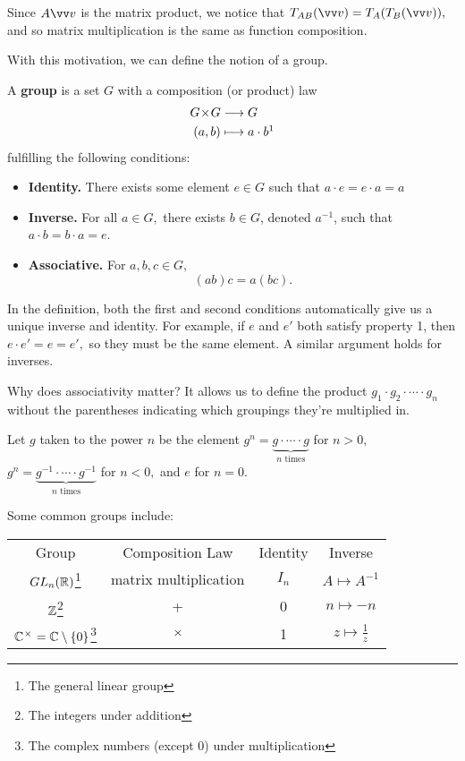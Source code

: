 Since $A\vvv$ is the matrix product, we notice that $T_{AB}(\vvv) = T_A(T_B(\vvv)),$ and so matrix multiplication is the same as function composition. 

With this motivation, we can define the notion of a group. 
\begin{definition}[Group]
A \textbf{group} is a set $G$ with a composition (or product) law 
\begin{align*}
    G \by G &\rto G \\
    (a, b) &\mto a\cdot b\footnotemark %
\end{align*}
fulfilling the following conditions:
\begin{itemize}
    \item \textbf{Identity.} There exists some element $e \in G$ such that $a \cdot e = e \cdot a = a$
    \item \textbf{Inverse.} For all $a \in G,$ there exists $b \in G$, denoted $a^{-1}$, such that $a \cdot b = b \cdot a = e$. 
    
    \item \textbf{Associative.} For $a, b, c \in G,$
    \[
    (ab)c = a(bc).
    \]
\end{itemize}
\end{definition}
In the definition, both the first and second conditions automatically give us a unique inverse and identity. For example, if $e$ and $e'$ both satisfy property 1, then $e\cdot e' = e = e',$ so they must be the same element. A similar argument holds for inverses. 

Why does associativity matter? It allows us to define the product $g_1 \cdot g_2\cdot  \cdots \cdot g_n$ without the parentheses indicating which groupings they're multiplied in. 

\begin{definition}
Let $g$ taken to the power $n$ be the element $g^n = \underbrace{g\cdot \cdots \cdot g}_{n \text{ times}}$ for $n > 0,$ $g^n = \underbrace{g^{-1}\cdot \cdots \cdot g^{-1}}_{n \text{ times}}$ for $n < 0,$ and $e$ for $n = 0.$
\end{definition}

\begin{example}
Some common groups include:

\begin{center}
\begin{tabular}{ c c c c }
 Group & Composition Law & Identity & Inverse \\ 
 $GL_n(\mathbb R)$\footnote{The general linear group} & matrix multiplication & $I_n$ & $A \mapsto A^{-1}$ \\  
 $\mathbb Z$\footnote{The integers under addition} & + & 0 & $n \mapsto -n$ \\
 $\mathbb C^{\hspace{0.05em}{\times}\hspace{0.05em}} = \mathbb C\setminus \{0\}$\footnote{The complex numbers (except 0) under multiplication} & $\hspace{0.05em}{\times}\hspace{0.05em}$ & 1 & $z \mapsto \frac{1}{z}$
\end{tabular}
\end{center}

\end{example}

